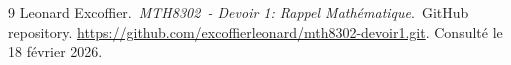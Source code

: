 \documentclass[12pt,letterpaper]{article}
\begin{document}


\begin{thebibliography}{9}
Leonard Excoffier.~\emph{MTH8302~- Devoir 1: Rappel Mathématique}.\ GitHub repository.
\url{https://github.com/excoffierleonard/mth8302-devoir1.git}. Consulté le 18 février 2026.
\end{thebibliography}
\end{document}
